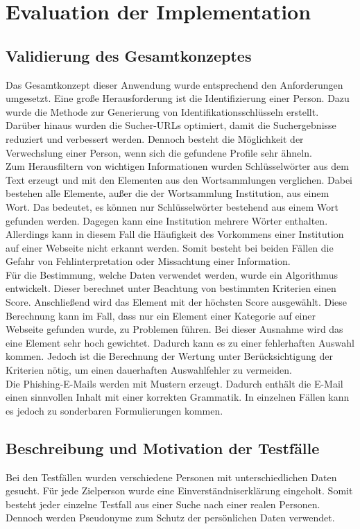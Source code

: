

\chapter{Evaluation der Implementation}  %
\label{cha:Evaluation der Implementation} %
\section{Validierung des Gesamtkonzeptes}
Das Gesamtkonzept dieser Anwendung wurde entsprechend den Anforderungen umgesetzt. Eine große Herausforderung ist die Identifizierung einer Person. Dazu wurde die Methode zur Generierung von Identifikationsschlüsseln erstellt. Darüber hinaus wurden die Sucher-URLs optimiert, damit die Suchergebnisse reduziert und verbessert werden. Dennoch besteht die Möglichkeit der Verwechslung einer Person, wenn sich die gefundene Profile sehr ähneln.\\
Zum Herausfiltern von wichtigen Informationen wurden Schlüsselwörter aus dem Text erzeugt und mit den Elementen aus den Wortsammlungen verglichen. Dabei bestehen alle Elemente, außer die der Wortsammlung Institution, aus einem Wort. Das bedeutet, es können nur Schlüsselwörter bestehend aus einem Wort gefunden werden. Dagegen kann eine Institution mehrere Wörter enthalten. Allerdings kann in diesem Fall die Häufigkeit des Vorkommens einer Institution auf einer Webseite nicht erkannt werden. Somit besteht bei beiden Fällen die Gefahr von Fehlinterpretation oder Missachtung einer Information.\\
Für die Bestimmung, welche Daten verwendet werden, wurde ein Algorithmus entwickelt. Dieser berechnet unter Beachtung von bestimmten Kriterien einen Score. Anschließend wird das Element mit der höchsten Score ausgewählt. Diese Berechnung kann im Fall, dass nur ein Element einer Kategorie auf einer Webseite gefunden wurde, zu Problemen führen. Bei dieser Ausnahme wird das eine Element sehr hoch gewichtet. Dadurch kann es zu einer fehlerhaften Auswahl kommen. Jedoch ist die Berechnung der Wertung unter Berücksichtigung der Kriterien nötig, um einen dauerhaften Auswahlfehler zu vermeiden.\\
Die Phishing-E-Mails werden mit Mustern erzeugt. Dadurch enthält die E-Mail einen sinnvollen Inhalt mit einer korrekten Grammatik. In einzelnen Fällen kann es jedoch zu sonderbaren Formulierungen kommen.

\section{Beschreibung und Motivation der Testfälle}
Bei den Testfällen wurden verschiedene Personen mit unterschiedlichen Daten gesucht. Für jede Zielperson wurde eine Einverständniserklärung eingeholt. Somit besteht jeder einzelne Testfall aus einer Suche nach einer realen Personen. Dennoch werden Pseudonyme zum Schutz der persönlichen Daten verwendet.
